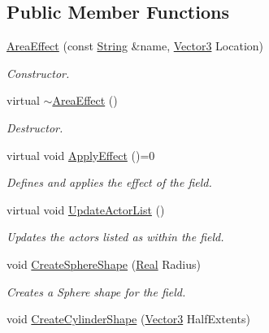 \subsection*{Public Member Functions}
\begin{DoxyCompactItemize}
\item 
\hyperlink{classphys_1_1AreaEffect_a0c6710f348ab875cca41b613798f1f2a}{AreaEffect} (const \hyperlink{namespacephys_aa03900411993de7fbfec4789bc1d392e}{String} \&name, \hyperlink{classphys_1_1Vector3}{Vector3} Location)
\begin{DoxyCompactList}\small\item\em Constructor. \item\end{DoxyCompactList}\item 
virtual \hyperlink{classphys_1_1AreaEffect_aa9e6d721d337c32aa47357060d319924}{$\sim$AreaEffect} ()
\begin{DoxyCompactList}\small\item\em Destructor. \item\end{DoxyCompactList}\item 
virtual void \hyperlink{classphys_1_1AreaEffect_a3b285ecfcf9c9200662d510e48dd222a}{ApplyEffect} ()=0
\begin{DoxyCompactList}\small\item\em Defines and applies the effect of the field. \item\end{DoxyCompactList}\item 
virtual void \hyperlink{classphys_1_1AreaEffect_a0a0e6dfc6353d19b19e7bea037172072}{UpdateActorList} ()
\begin{DoxyCompactList}\small\item\em Updates the actors listed as within the field. \item\end{DoxyCompactList}\item 
void \hyperlink{classphys_1_1AreaEffect_aa794048d274ea12775b14de39171f14d}{CreateSphereShape} (\hyperlink{namespacephys_af7eb897198d265b8e868f45240230d5f}{Real} Radius)
\begin{DoxyCompactList}\small\item\em Creates a Sphere shape for the field. \item\end{DoxyCompactList}\item 
void \hyperlink{classphys_1_1AreaEffect_a7329a52fdd8382d19d39bed1ab2eea61}{CreateCylinderShape} (\hyperlink{classphys_1_1Vector3}{Vector3} HalfExtents)

\end{DoxyCompactItemize}
